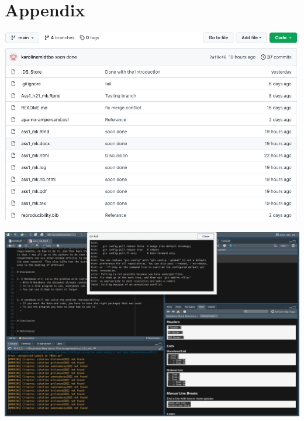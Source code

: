 \documentclass[
  12pt,
]{article}
\begin{document}
\hypertarget{appendix}{%
\section{Appendix}\label{appendix}}

\includegraphics{images/Skjermbilde 2021-09-15 kl. 10.29.21.png}

\includegraphics{images/Skjermbilde 2021-09-14 kl. 12.31.26.png}
\end{document}
